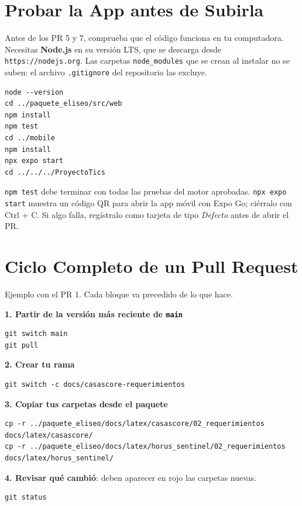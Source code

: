 \documentclass[11pt,a4paper]{article}
\begin{document}
\section{Probar la App antes de Subirla}
Antes de los PR 5 y 7, comprueba que el código funciona en tu computadora. Necesitas \textbf{Node.js} en su versión LTS, que se descarga desde \nolinkurl{https://nodejs.org}. Las carpetas \texttt{node\_modules} que se crean al instalar no se suben: el archivo \texttt{.gitignore} del repositorio las excluye.

\begin{lstlisting}
node --version
cd ../paquete_eliseo/src/web
npm install
npm test
cd ../mobile
npm install
npx expo start
cd ../../../ProyectoTics
\end{lstlisting}

\noindent \texttt{npm test} debe terminar con todas las pruebas del motor aprobadas. \texttt{npx expo start} muestra un código QR para abrir la app móvil con Expo Go; ciérralo con Ctrl + C. Si algo falla, regístralo como tarjeta de tipo \textit{Defecto} antes de abrir el PR.


\section{Ciclo Completo de un Pull Request}
Ejemplo con el PR 1. Cada bloque va precedido de lo que hace.

\vspace{0.1cm}
\noindent\textbf{1. Partir de la versión más reciente de \texttt{main}}
\begin{lstlisting}
git switch main
git pull
\end{lstlisting}

\noindent\textbf{2. Crear tu rama}
\begin{lstlisting}
git switch -c docs/casascore-requerimientos
\end{lstlisting}

\noindent\textbf{3. Copiar tus carpetas desde el paquete}
\begin{lstlisting}
cp -r ../paquete_eliseo/docs/latex/casascore/02_requerimientos docs/latex/casascore/
cp -r ../paquete_eliseo/docs/latex/horus_sentinel/02_requerimientos docs/latex/horus_sentinel/
\end{lstlisting}

\noindent\textbf{4. Revisar qué cambió}: deben aparecer en rojo las carpetas nuevas.
\begin{lstlisting}
git status
\end{lstlisting}
\end{document}
